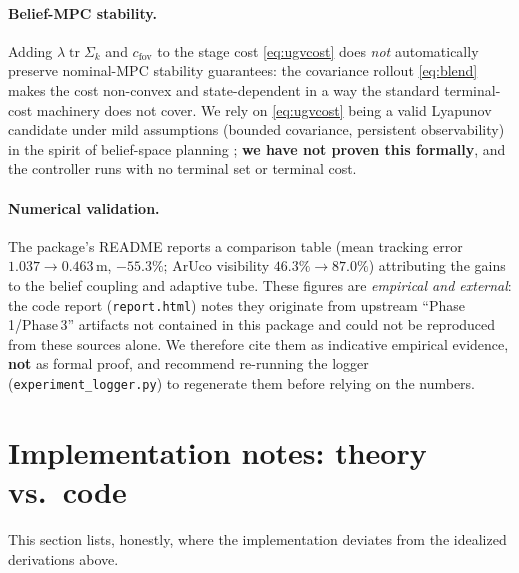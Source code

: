 \documentclass[11pt]{article}
\DeclareMathOperator{\tr}{tr}
\newcommand{\code}[1]{\texttt{#1}}
\newcommand{\fov}{\mathrm{fov}}
\begin{document}
\paragraph{Belief-MPC stability.} Adding $\lambda\tr\Sigma_k$ and $c_{\fov}$ to the stage cost
\cref{eq:ugvcost} does \emph{not} automatically preserve nominal-MPC stability guarantees: the covariance
rollout \cref{eq:blend} makes the cost non-convex and state-dependent in a way the standard terminal-cost
machinery does not cover. We rely on \cref{eq:ugvcost} being a valid Lyapunov candidate under mild assumptions
(bounded covariance, persistent observability) in the spirit of belief-space planning
\citep{platt2010belief,vandenberg2012motion}; \textbf{we have not proven this formally}, and the controller
runs with no terminal set or terminal cost.

\paragraph{Numerical validation.} The package's README reports a comparison table (mean tracking error
$1.037\to0.463$\,m, $-55.3\%$; ArUco visibility $46.3\%\to87.0\%$) attributing the gains to the belief
coupling and adaptive tube. These figures are \emph{empirical and external}: the code report (\code{report.html})
notes they originate from upstream ``Phase\,1/Phase\,3'' artifacts not contained in this package and could not
be reproduced from these sources alone. We therefore cite them as indicative empirical evidence, \textbf{not}
as formal proof, and recommend re-running the logger (\code{experiment\_logger.py}) to regenerate them before
relying on the numbers.

\section{Implementation notes: theory vs.\ code}
\label{sec:impl}

This section lists, honestly, where the implementation deviates from the idealized derivations above.
\end{document}
